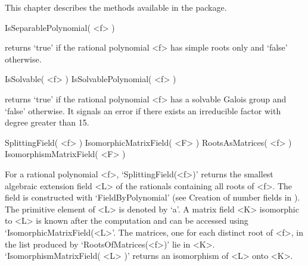 


This chapter describes the methods available in the {\Radiroot}
package.
 

\> IsSeparablePolynomial( <f> )

returns `true' if the rational polynomial <f> has simple roots only
and `false' otherwise.

\> IsSolvable( <f> )
\> IsSolvablePolynomial( <f> )

returns `true' if the rational polynomial <f> has a solvable Galois group and
`false' otherwise. It signals an error if there exists an irreducible factor
with degree greater than 15.

\> SplittingField( <f> )
\> IsomorphicMatrixField( <F> )
\> RootsAsMatrices( <f> )
\> IsomorphismMatrixField( <F> )

For a rational polynomial <f>, `SplittingField(<f>)' returns the
smallest algebraic extension field <L> of the rationals containing all
roots of <f>. The field is constructed with `FieldByPolynomial' (see
Creation of number fields in \Alnuth). The primitive element of <L> is
denoted by `a'. A matrix field <K> isomorphic to <L> is known after
the computation and can be accessed using `IsomorphicMatrixField(<L>'.
The matrices, one for each distinct root of <f>, in the list produced
by `RootsOfMatrices(<f>)' lie in <K>. `IsomorphismMatrixField( <L> )'
returns an isomorphism of <L> onto <K>.

